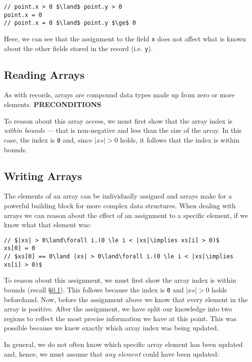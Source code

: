 \begin{lstlisting}
// point.x > 0 $\land$ point.y > 0
point.x = 0
// point.x = 0 $\land$ point.y $\ge$ 0
\end{lstlisting}

Here, we can see that the assignment to the field \lstinline{x} does not affect what is known about the other fields stored in the record (i.e. \lstinline{y}).

\subsection{Reading Arrays}
\label{c_reasoning_reading_arrays}
As with records, arrays are compound data types made up from zero or more elements.    {\bf PRECONDITIONS}

To reason about this array access, we must first show that the array index is {\em within bounds} --- that is non-negative and less than the size of the array.  In this case, the index is \lstinline{0} and, since $|xs| > 0$ holds, it follows that the index is within bounds.


\subsection{Writing Arrays}
The elements of an array can be individually assigned and arrays make for a powerful building block for more complex data structures.  When dealing with arrays we can reason about the effect of an assignment to a specific element, if we know what that element was:

\begin{lstlisting}
// $|xs| > 0\land\forall i.(0 \le i < |xs|\implies xs[i] > 0)$
xs[0] = 0
// $xs[0] == 0\land |xs| > 0\land\forall i.(0 \le i < |xs|\implies xs[i] > 0)$
\end{lstlisting}

To reason about this assignment, we must first show the array index is within bounds (recall \S\ref{c_reasoning_reading_arrays}).  This follows because the index is \lstinline{0} and $|xs| > 0$ holds beforehand.  Now, before the assignment above we know that every element in the array is positive.  After the assignment, we have split our knowledge into two regions to reflect the most precise information we have at this point.  This was possible because we knew exactly which array index was being updated.

In general, we do not often know which specific array element has been updated and, hence, we must assume that {\em any element} could have been updated:

